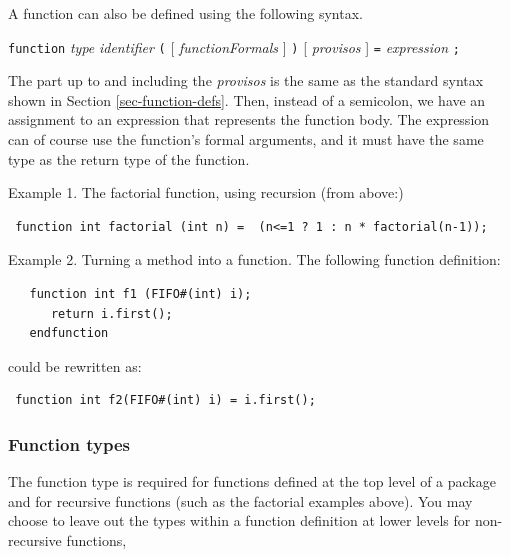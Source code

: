 \documentclass[twoside,letterpaper]{article}
\newcommand{\hm}{\hspace*{1em}}
\newcommand{\nterm}[1]{\emph{#1}}
\newcommand{\term}[1]{\texttt{#1}}
\newcommand{\opt}[1]{[ #1 ]}
\newcommand{\gram}[2]{    \hm\makebox[10em][l]{\it #1}\makebox[1.5em][l]{::=}    #2}
\newcommand{\grammore}[1]{\hm\makebox[10em][l]{      }\makebox[1.5em][l]{}       #1}
\begin{document}
A function can also be defined using the following syntax.

\gram{functionProto}{ \term{function} \nterm{type} \nterm{identifier}
                          \term{(}
                          \opt { \nterm{functionFormals} }
                          \term{)}
                         \opt{ \nterm{provisos} }}
\grammore{\term{=} \nterm{expression} \term{;} }               

The part up to and including the \nterm{provisos} is the same as
the standard syntax shown in Section {\ref{sec-function-defs}}.
Then, instead of a semicolon, we have an assignment to an expression
that represents the function body.   The expression can of course use the
 function's formal arguments, and it must have the same type as the
return type of the function.  



   
      
   
   
   
Example 1.  The factorial function, using recursion (from above:)  
\begin{verbatim}
 function int factorial (int n) =  (n<=1 ? 1 : n * factorial(n-1));
\end{verbatim}

Example 2.  Turning a method into a function. The following function definition:
\begin{verbatim}
   function int f1 (FIFO#(int) i);
      return i.first();
   endfunction
\end{verbatim}
could be rewritten as:
\begin{verbatim}
 function int f2(FIFO#(int) i) = i.first();
\end{verbatim}

\subsubsection{Function types}

The function type is  required for functions defined at the top
level of a package and for recursive functions (such as the factorial
examples above).  You may choose to
leave out the types within a function definition at lower levels for
non-recursive functions,
\end{document}
